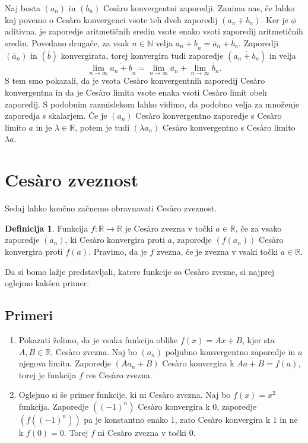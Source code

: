 \documentclass[a4paper,12pt]{article}
\def\N{\mathbb{N}}
\def\R{\mathbb{R}}
\theoremstyle{definition}
\newtheorem{definicija}{Definicija}
\theoremstyle{plain}
\begin{document}
Naj bosta $(a_n)$ in $(b_n)$ Ces\`{a}ro konvergentni zaporedji. Zanima nas, če lahko kaj povemo o Ces\`{a}ro konvergenci vsote teh dveh zaporedij $(a_n + b_n)$. Ker je $\phi$ aditivna, je zaporedje aritmetičnih sredin vsote enako vsoti zaporedij aritmetičnih sredin. Povedano drugače, za vsak $n \in \N$ velja $\overline{a_n + b}_n = \overline{a}_n + \overline{b}_n$. Zaporedji $(\overline{a}_n)$ in $(\overline{b})$ konvergirata, torej konvergira tudi zaporedje $(\overline{a_n + b_n})$ in velja
$$\lim_{n \rightarrow \infty} \overline{a_n + b}_n = \lim_{n \rightarrow \infty} \overline{a}_n + \lim_{n \rightarrow \infty} \overline{b}_n.$$
S tem smo pokazali, da je vsota Ces\`{a}ro konvergentnih zaporedij Ces\`{a}ro konvergentna in da je Ces\`{a}ro limita vsote enaka vsoti Ces\`{a}ro limit obeh zaporedij.
S podobnim razmislekom lahko vidimo, da podobno velja za množenje zaporedja s skalarjem. Če je $(a_n)$ Ces\`{a}ro konvergentno zaporedje s Ces\`{a}ro limito $a$ in je $\lambda \in \R$, potem je tudi $(\lambda a_n)$ Ces\`{a}ro konvergentno s Ces\`{a}ro limito $\lambda a$.

\section{Ces\`{a}ro zveznost}
Sedaj lahko končno začnemo obravnavati Ces\`{a}ro zveznost.

\begin{definicija}
    Funkcija $f: \mathbb{R} \rightarrow \mathbb{R}$ je Ces\`{a}ro zvezna v točki $a \in \mathbb{R}$, če za vsako zaporedje $(a_n)$, ki Ces\`{a}ro konvergira proti $a$, zaporedje $(f(a_n))$ Ces\`{a}ro konvergira proti $f(a)$. Pravimo, da je $f$ zvezna, če je zvezna v vsaki točki $a \in \mathbb{R}$.
\end{definicija}

Da si bomo lažje predstavljali, katere funkcije so Ces\`{a}ro zvezne, si najprej oglejmo kakšen primer.

\subsection*{Primeri}
\begin{enumerate}
    \item Pokazati želimo, da je vsaka funkcija oblike $f(x) = Ax + B$, kjer sta $A, B \in \mathbb{R}$, Ces\`{a}ro zvezna. Naj bo $(a_n)$ poljubno konvergentno zaporedje in $a$ njegova limita. Zaporedje $(A a_n + B)$ Ces\`{a}ro konvergira k $A a + B = f(a)$, torej je funkcija $f$ res Ces\`{a}ro zvezna.
    \item Oglejmo si še primer funkcije, ki ni Ces\`{a}ro zvezna. Naj bo $f(x) = x^2$ funkcija. Zaporedje $((-1)^n)$ Ces\`{a}ro konvergira k $0$, zaporedje $(f((-1)^n))$ pa je konstantno enako $1$, zato Ces\`{a}ro konvergira k $1$ in ne k $f(0) = 0$. Torej $f$ ni Ces\`{a}ro zvezna v točki $0$.
\end{enumerate}
\end{document}
